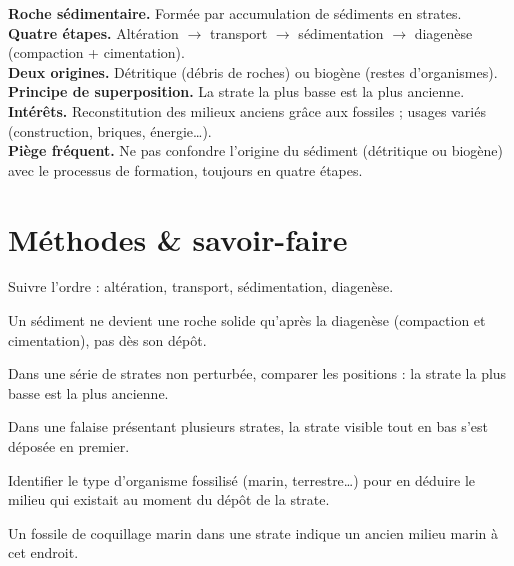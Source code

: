 \begin{synthese}
\textbf{Roche sédimentaire.} Formée par accumulation de sédiments en strates.\\[4pt]
\textbf{Quatre étapes.} Altération $\to$ transport $\to$ sédimentation $\to$
diagenèse (compaction + cimentation).\\[4pt]
\textbf{Deux origines.} Détritique (débris de roches) ou biogène (restes
d'organismes).\\[4pt]
\textbf{Principe de superposition.} La strate la plus basse est la plus
ancienne.\\[4pt]
\textbf{Intérêts.} Reconstitution des milieux anciens grâce aux fossiles ; usages
variés (construction, briques, énergie\dots).\\[4pt]
\textbf{Piège fréquent.} Ne pas confondre l'origine du sédiment (détritique ou
biogène) avec le processus de formation, toujours en quatre étapes.
\end{synthese}

\section{Méthodes \& savoir-faire}

Suivre l'ordre : altération, transport, sédimentation, diagenèse.
\begin{exemple}
Un sédiment ne devient une roche solide qu'après la diagenèse (compaction et
cimentation), pas dès son dépôt.
\end{exemple}

Dans une série de strates non perturbée, comparer les positions : la strate la plus
basse est la plus ancienne.
\begin{exemple}
Dans une falaise présentant plusieurs strates, la strate visible tout en bas s'est
déposée en premier.
\end{exemple}

Identifier le type d'organisme fossilisé (marin, terrestre\dots) pour en déduire le
milieu qui existait au moment du dépôt de la strate.
\begin{exemple}
Un fossile de coquillage marin dans une strate indique un ancien milieu marin à cet
endroit.
\end{exemple}

